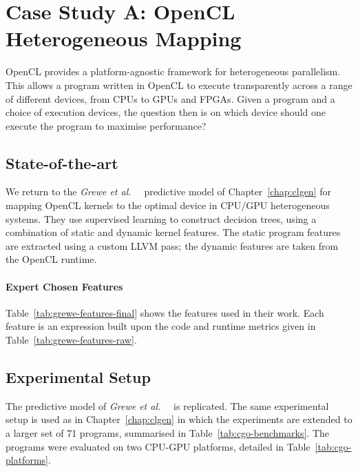 \section{Case Study A: OpenCL Heterogeneous Mapping}
\label{sec:deeptune-case-study-a}

OpenCL provides a platform-agnostic framework for heterogeneous parallelism. This allows a program written in OpenCL to execute transparently across a range of different devices, from CPUs to GPUs and FPGAs. Given a program and a choice of execution devices, the question then is on which device should one execute the program to maximise performance?

\subsection{State-of-the-art}

We return to the \emph{Grewe et al.\ }~\cite{Grewe2013} predictive model of Chapter~\ref{chap:clgen} for mapping OpenCL kernels to the optimal device in CPU/GPU heterogeneous systems. They use supervised learning to construct decision trees, using a combination of static and dynamic kernel features. The static program features are extracted using a custom LLVM pass; the dynamic features are taken from the OpenCL runtime.

\paragraph*{Expert Chosen Features}

Table~\ref{tab:grewe-features-final} shows the features used in their work. Each feature is an expression built upon the code and runtime metrics given in Table~\ref{tab:grewe-features-raw}.



\subsection{Experimental Setup}

The predictive model of \emph{Grewe et al.\ }~\cite{Grewe2013} is replicated. The same experimental setup is used as in Chapter~\ref{chap:clgen} in which the experiments are extended to a larger set of 71 programs, summarised in Table~\ref{tab:cgo-benchmarks}. The programs were evaluated on two CPU-GPU platforms, detailed in Table~\ref{tab:cgo-platforms}.

